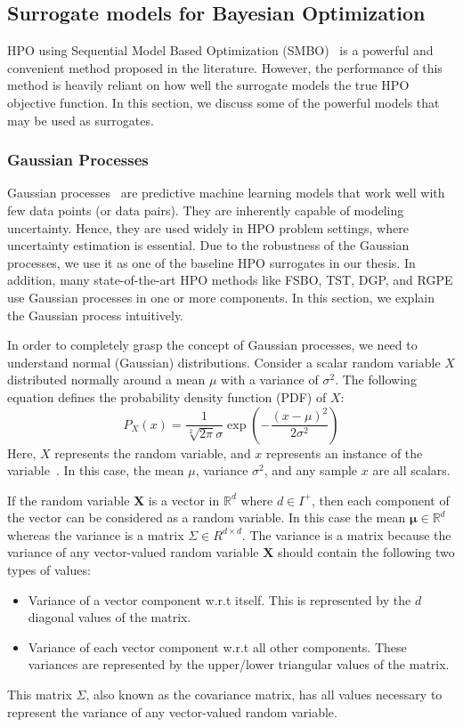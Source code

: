 \documentclass[12pt, twoside, ngerman]{report}
\begin{document}
\subsection{Surrogate models for Bayesian Optimization}
\label{sec:SurrogateModelsForBO}
HPO using Sequential Model Based Optimization (SMBO)~\cite{NIPS2011_86e8f7ab} is a powerful and convenient method proposed in the literature.
However,  the performance of this method is heavily reliant on how well the surrogate models the true HPO objective function.
In this section, we discuss some of the powerful models that may be used as surrogates.

\subsubsection{Gaussian Processes}
\label{sec:GaussianProcesses}
Gaussian processes~\cite{GPTutorial} are predictive machine learning models that work well with few data points (or data pairs). 
They are inherently capable of modeling uncertainty.
Hence, they are used widely in HPO problem settings, where uncertainty estimation is essential. 
Due to the robustness of the Gaussian processes, we use it as one of the baseline HPO surrogates in our thesis.
In addition, many state-of-the-art HPO methods like FSBO, TST, DGP, and RGPE use Gaussian processes in one or more components.
In this section, we explain the Gaussian process intuitively.

In order to completely grasp the concept of Gaussian processes,  we need to understand normal (Gaussian) distributions. 
Consider a scalar random variable $X$ distributed normally around a mean $\mu$ with a variance of $\sigma^2$.
The following equation defines the probability density function (PDF) of $X$: 
$$
P_X(x) = \frac{1}{\sqrt[2]{2\pi}\sigma}\exp\left(- \frac{(x - \mu)^2}{2\sigma^2}\right)
$$
Here, $X$ represents the random variable, and $x$ represents an instance of the variable~\cite{GPTutorial}.
In this case,  the mean $\mu$,  variance $\sigma^2$, and any sample $x$ are all scalars.

If the random variable $\textbf{X}$ is a vector in $\mathbb{R}^d$ where $d \in I^{+}$,  then each component of the vector can be considered as a random variable.
In this case the mean $\boldsymbol{\mu} \in \mathbb{R}^d$ whereas the variance is a matrix $\Sigma \in R^{d \times d}$.
The variance is a matrix because the variance of any vector-valued random variable $\textbf{X}$ should contain the following two types of values:
\begin{itemize}
\item Variance of a vector component w.r.t itself. This is represented by
the $d$ diagonal values of the matrix.
\item Variance of each vector component w.r.t all other components. These variances are represented by the upper/lower triangular values of the matrix.
\end{itemize}
This matrix $\Sigma$, also known as the covariance matrix, has all values necessary to represent the variance of any vector-valued random variable.
\end{document}
